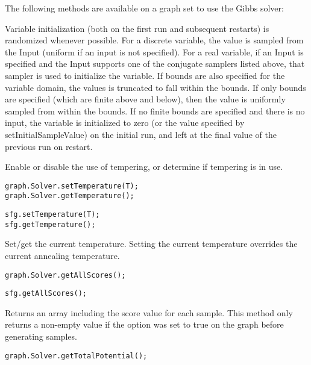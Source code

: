
The following methods are available on a graph set to use the Gibbs solver:

Variable initialization (both on the first run and subsequent restarts) is randomized whenever possible.  For a discrete variable, the value is sampled from the Input (uniform if an input is not specified).  For a real variable, if an Input is specified and the Input supports one of the conjugate samplers listed above, that sampler is used to initialize the variable.  If bounds are also specified for the variable domain, the values is truncated to fall within the bounds.  If only bounds are specified (which are finite above and below), then the value is uniformly sampled from within the bounds.  If no finite bounds are specified and there is no input, the variable is initialized to zero (or the value specified by setInitialSampleValue) on the initial run, and left at the final value of the previous run on restart.

Enable or disable the use of tempering, or determine if tempering is in use.

\ifmatlab
\begin{lstlisting}
graph.Solver.setTemperature(T);
graph.Solver.getTemperature();
\end{lstlisting}
\fi

\ifjava
\begin{lstlisting}
sfg.setTemperature(T);
sfg.getTemperature();
\end{lstlisting}
\fi

Set/get the current temperature. Setting the current temperature overrides the current annealing temperature.

\ifmatlab
\begin{lstlisting}
graph.Solver.getAllScores();
\end{lstlisting}
\fi

\ifjava
\begin{lstlisting}
sfg.getAllScores();
\end{lstlisting}
\fi

Returns an array including the score value for each sample. This method only returns a non-empty value if the  option was set to true on the graph before generating samples.

\ifmatlab
\begin{lstlisting}
graph.Solver.getTotalPotential();
\end{lstlisting}
\fi

